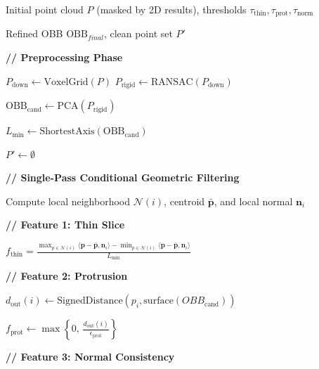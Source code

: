 \begin{algorithm}[t]
\caption{Pixel-to-3D Cross Consistency Conditional Filtering (PX3C)}
\label{alg:px3c}
\begin{algorithmic}[1]

\Require Initial point cloud $P$ (masked by 2D results), thresholds
$\tau_{\mathrm{\text{thin}}},\tau_{\mathrm{\text{prot}}},\tau_{\mathrm{norm}}$

\Ensure Refined OBB $\mathrm{OBB}_{final}$, clean point set $P'$

\State \textbf{// Preprocessing Phase}

\State $P_{\text{down}} \gets \mathrm{VoxelGrid}(P)$
\State $P_{\text{rigid}} \gets \mathrm{RANSAC}(P_{\text{down}})$

\State $\mathrm{OBB}_{\text{cand}} \gets \mathrm{PCA}(P_{\text{rigid}})$

\State $L_{\text{min}} \gets \mathrm{ShortestAxis}(\mathrm{OBB}_{\text{cand}})$

\State {}

\State $P' \gets \emptyset$

\State \textbf{// Single-Pass Conditional Geometric Filtering}


    \State Compute local neighborhood $\mathcal{N}(i)$,
           centroid $\bar{\boldsymbol p}$, and local normal $\boldsymbol n_i$

    \State \textbf{// Feature 1: Thin Slice}

    \State
    $f_{\text{thin}}=\frac{\max_{p\in\mathcal{N}(i)}\langle\boldsymbol{p}-\bar{\boldsymbol{p}},\boldsymbol{n}_i\rangle-
\min_{p\in\mathcal{N}(i)}\langle\boldsymbol{p}-\bar{\boldsymbol{p}},\boldsymbol{n}_i\rangle}{L_{\min}}$

    \State \textbf{// Feature 2: Protrusion}

    \State
    $d_{\text{out}}(i)
    \gets
    \mathrm{SignedDistance}
    \!\left(
    p_i,
    \mathrm{surface}(OBB_{\text{cand}})
    \right)$

    \State
    $f_{\text{prot}}
    \gets
    \max\!\left\{0,\,
    \frac{d_{\text{out}}(i)}{\epsilon_{\text{prot}}}
    \right\}$

    \State \textbf{// Feature 3: Normal Consistency}


\end{algorithmic}
\end{algorithm}
